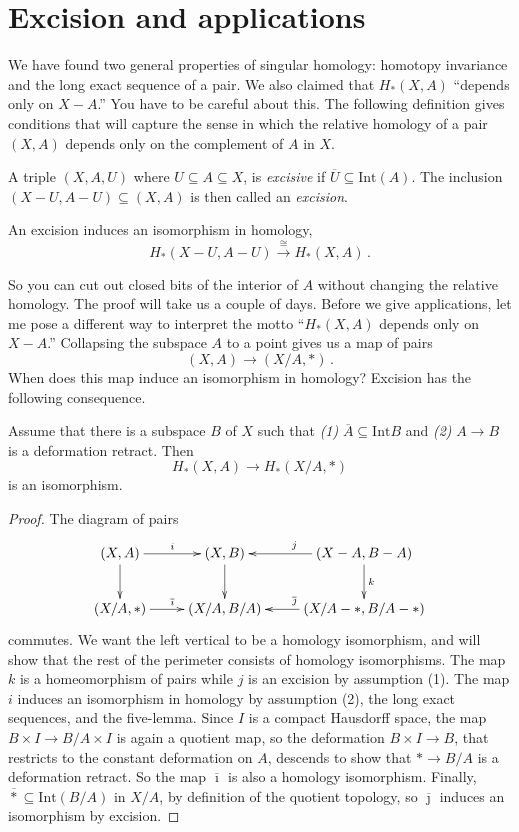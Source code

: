 \section{Excision and applications}
We have found two general properties of singular homology: homotopy invariance and the long exact sequence of a pair. We also claimed that $H_\ast(X,A)$ ``depends only on $X-A$.'' You have to be careful about this. The following definition gives conditions that will capture the sense in which the relative homology of a pair $(X,A)$ depends only on the complement of $A$ in $X$. 
\begin{definition}
A triple $(X,A,U)$ where $U\subseteq A\subseteq X$, is \emph{excisive} if $\overline{U}\subseteq\mathrm{Int}(A)$. 
The inclusion $(X-U,A-U)\subseteq (X,A)$ is then called an {\em excision}.
\end{definition}

\begin{theorem}
An excision induces an isomorphism in homology,
\[
H_\ast(X-U,A-U)\xrightarrow{\cong}H_\ast(X,A)\,.
\]
\end{theorem}
So you can cut out closed bits of the interior of $A$ without changing the relative homology. The proof will take us a couple of days. Before we give applications, let me pose a different way to interpret the motto ``$H_*(X,A)$ depends only on $X-A$.'' Collapsing the subspace $A$ to a point gives us a map of pairs
\[
(X,A)\to(X/A,\ast)\,.
\]
When does this map induce an isomorphism in homology? Excision has the following consequence.
\begin{corollary} Assume that there is a subspace $B$ of $X$ such that 
{\em(1)} $\overline A\subseteq\mathrm{Int}B$ and 
{\em(2)} $A\to B$ is a deformation retract.
Then 
\[
H_*(X,A)\to H_*(X/A,*)
\]
is an isomorphism. 
\end{corollary}
\begin{proof} 
The diagram of pairs
\[
\xymatrix{
(X,A) \ar[d] \ar[r]^i & (X,B) \ar[d] & (X-A,B-A) \ar[d]^k \ar[l]_j \\
(X/A,\ast) \ar[r]^{\overline\imath} & (X/A,B/A) & 
(X/A-\ast,B/A-\ast) \ar[l]_{\overline\jmath} 
}\]
commutes. We want the left vertical to be a homology isomorphism, and
will show that the rest of the perimeter consists of homology isomorphisms.  
The map $k$ is a homeomorphism of pairs while $j$ is an excision by assumption
(1). The map $i$ induces an isomorphism in homology by assumption (2),
the long exact sequences, and the five-lemma.
Since $I$ is a compact Hausdorff space, the map $B\times I\to B/A\times I$
is again a quotient map, so the deformation $B\times I\to B$, that restricts
to the constant deformation on $A$, descends to show that $\ast\to B/A$ 
is a deformation retract. So the map $\overline\imath$ 
is also a homology isomorphism. 
Finally, $\overline\ast\subseteq\mathrm{Int}(B/A)$ in $X/A$, by definition
of the quotient topology, so $\overline\jmath$ induces an isomorphism by
excision. 
\end{proof}


